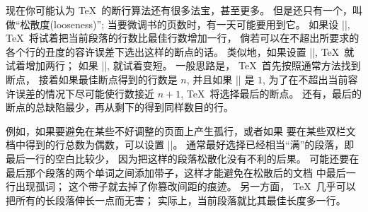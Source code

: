 \ddanger 现在你可能认为 \TeX\ 的断行算法还有很多法宝，甚至更多。%
但是还只有一个，叫做``松散度(looseness)'';
当要微调书的页数时，有一天可能要用到它。
如果设 ||,  \TeX\ 将试着把当前段落的行数比最佳行数增加一行，
倘若可以在不超出所要求的各个行的丑度的容许误差下选出这样的断点的话。%
类似地，如果设置 ||,  \TeX\ 就试着增加两行；
如果 ||, 就试着变\hbox{短。}%
\1一般思路是， \TeX\ 首先按照通常方法找到断点，
接着如果最佳断点得到的行数是 $n$, 并且如果 |\looseness| 是 $1$,
为了在不超出当前容许误差的情况下尽可能使行数接近 $n+1$,  \TeX\ 将选择最后的断点。%
还有，最后的断点的总缺陷最少，再从剩下的得到同样数目的行。

\ddanger 例如，如果要避免在某些不好调整的页面上产生孤行，或者如果%
要在某些双栏文档中得到的行总数为偶数，可以设置 ||。%
通常最好选择已经相当``满''的段落，即最后一行的空白比较少，
因为把这样的段落松散化没有不利的后果。%
可能还要在最后那个段落的两个单词之间添加带子，这样才能避免在松散后的文档%
中最后一行出现孤词；
这个带子就去掉了你篡改间距的痕迹。%
另一方面， \TeX\ 几乎可以把所有的长段落伸长一点而无害；
实际上，当前段落就比其最佳长度\hbox{多一行。}

